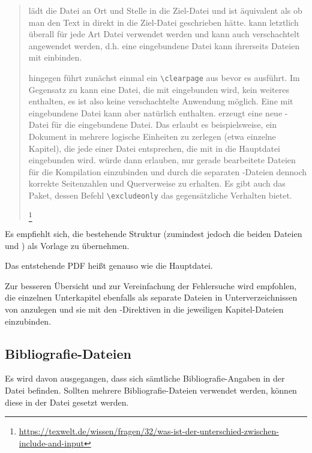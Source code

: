 \begin{quote}
{\small
\verb++ lädt die Datei an Ort und Stelle in die Ziel-Datei und ist äquivalent
als ob man den Text in  direkt in die Ziel-Datei geschrieben hätte.
\verb++ kann letztlich überall für jede Art Datei verwendet werden und kann auch verschachtelt angewendet werden,
d.h. eine eingebundene Datei kann ihrerseits Dateien mit \verb++ einbinden.

\verb++ hingegen führt zunächst einmal ein \verb+\clearpage+ aus bevor es \verb++ ausführt.
Im Gegensatz zu \verb++ kann eine Datei, die mit \verb++ eingebunden wird,
kein weiteres \verb++ enthalten, es ist also keine verschachtelte Anwendung möglich.
Eine mit \verb++ eingebundene Datei kann aber natürlich \verb++ enthalten.
\verb++ erzeugt eine neue -Datei für die eingebundene Datei.
Das erlaubt es beispielsweise, ein Dokument in mehrere logische Einheiten zu zerlegen (etwa einzelne Kapitel),
die jede einer Datei entsprechen, die mit \verb++ in die Hauptdatei eingebunden wird.
\verb++ würde dann erlauben, nur gerade bearbeitete Dateien für die Kompilation einzubinden
und durch die separaten -Dateien dennoch korrekte Seitenzahlen und Querverweise zu erhalten.
Es gibt auch das  Paket, dessen Befehl \verb+\excludeonly+ das gegensätzliche Verhalten bietet.%
}%
\footnote{\url{https://texwelt.de/wissen/fragen/32/was-ist-der-unterschied-zwischen-include-and-input}}
\end{quote}

Es empfiehlt sich, die bestehende Struktur (zumindest jedoch die beiden Dateien
 und )
als Vorlage zu übernehmen.

Das entstehende PDF heißt genauso wie die Hauptdatei.

Zur besseren Übersicht und zur Vereinfachung der Fehlersuche wird empfohlen,
die einzelnen Unterkapitel ebenfalls als separate Dateien in Unterverzeichnissen von  anzulegen
und sie mit den \verb++-Direktiven in die jeweiligen Kapitel-Dateien einzubinden.



\subsection[Bibliografie-Dateien]{Bibliografie-Dateien}%
%
\label{sec:Bibliografie}
%
Es wird davon ausgegangen, dass sich sämtliche Bibliografie-Angaben in der Datei
 befinden.
Sollten mehrere Bibliografie-Dateien verwendet werden, können diese in der Datei
 gesetzt werden.



